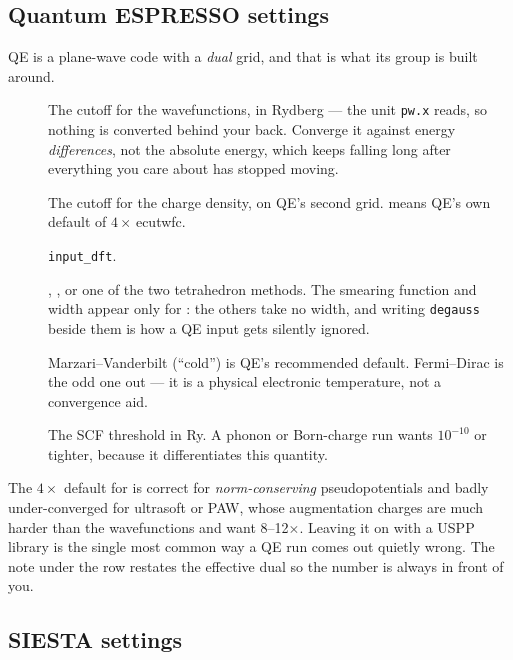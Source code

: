 \subsection{Quantum ESPRESSO settings}
\label{sec:qe-settings}

QE is a plane-wave code with a \emph{dual} grid, and that is what its group is
built around.

\begin{description}
  \item[] The cutoff for the wavefunctions, in Rydberg --- the
    unit \texttt{pw.x} reads, so nothing is converted behind your back.
    Converge it against energy \emph{differences}, not the absolute energy,
    which keeps falling long after everything you care about has stopped
    moving.
  \item[] The cutoff for the charge density, on QE's second grid.
     means QE's own default of $4\times$\,ecutwfc.
  \item[] \texttt{input\_dft}.
  \item[] , , or one of the two
    tetrahedron methods. The smearing function and width appear only for
    : the others take no width, and writing \texttt{degauss}
    beside them is how a QE input gets silently ignored.
  \item[] Marzari--Vanderbilt (``cold'') is QE's recommended
    default. Fermi--Dirac is the odd one out --- it is a physical electronic
    temperature, not a convergence aid.
  \item[] The SCF threshold in Ry. A phonon or Born-charge run
    wants $10^{-10}$ or tighter, because it differentiates this quantity.
\end{description}

\begin{calwarn}
The $4\times$ default for  is correct for \emph{norm-conserving}
pseudopotentials and badly under-converged for ultrasoft or PAW, whose
augmentation charges are much harder than the wavefunctions and want
8--12$\times$. Leaving it on  with a USPP library is the single most
common way a QE run comes out quietly wrong. The note under the row restates
the effective dual so the number is always in front of you.
\end{calwarn}

\subsection{SIESTA settings}
\label{sec:siesta-settings}

